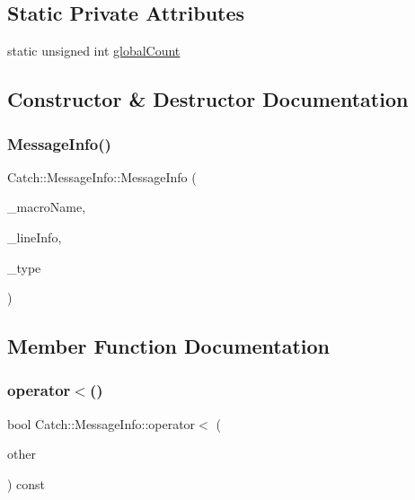 \subsection*{Static Private Attributes}
\begin{DoxyCompactItemize}
\item 
static unsigned int \mbox{\hyperlink{struct_catch_1_1_message_info_a250459555d236f9510a5afd78a6c1979}{global\+Count}}
\end{DoxyCompactItemize}


\subsection{Constructor \& Destructor Documentation}
\mbox{\label{struct_catch_1_1_message_info_afac7a84a9e8655428035a3c5418044f0}} 
\subsubsection{\texorpdfstring{MessageInfo()}{MessageInfo()}}
{\footnotesize\ttfamily Catch\+::\+Message\+Info\+::\+Message\+Info (\begin{DoxyParamCaption}\item[{\mbox{\hyperlink{class_catch_1_1_string_ref}{String\+Ref}} const \&}]{\+\_\+macro\+Name,  }\item[{\mbox{\hyperlink{struct_catch_1_1_source_line_info}{Source\+Line\+Info}} const \&}]{\+\_\+line\+Info,  }\item[{\mbox{\hyperlink{struct_catch_1_1_result_was_a624e1ee3661fcf6094ceef1f654601ef}{Result\+Was\+::\+Of\+Type}}}]{\+\_\+type }\end{DoxyParamCaption})}



\subsection{Member Function Documentation}
\mbox{\label{struct_catch_1_1_message_info_a8254cb8fca2da02a29a9843cdcb79df1}} 
\subsubsection{\texorpdfstring{operator$<$()}{operator<()}}
{\footnotesize\ttfamily bool Catch\+::\+Message\+Info\+::operator$<$ (\begin{DoxyParamCaption}\item[{\mbox{\hyperlink{struct_catch_1_1_message_info}{Message\+Info}} const \&}]{other }\end{DoxyParamCaption}) const}

